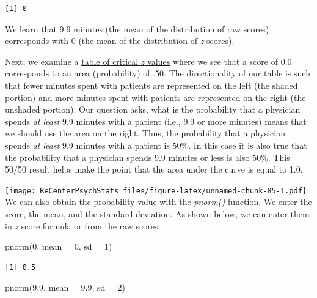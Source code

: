 \documentclass[
  11pt,
]{book}
\newenvironment{Shaded}{\begin{snugshade}}{\end{snugshade}}
\newcommand{\AttributeTok}[1]{\textcolor[rgb]{0.77,0.63,0.00}{#1}}
\newcommand{\DecValTok}[1]{\textcolor[rgb]{0.00,0.00,0.81}{#1}}
\newcommand{\FloatTok}[1]{\textcolor[rgb]{0.00,0.00,0.81}{#1}}
\newcommand{\FunctionTok}[1]{\textcolor[rgb]{0.00,0.00,0.00}{#1}}
\newcommand{\NormalTok}[1]{#1}
\begin{document}
\begin{verbatim}
[1] 0
\end{verbatim}

We learn that 9.9 minutes (the mean of the distribution of raw scores) corresponds with 0 (the mean of the distribution of \emph{z}-scores).

Next, we examine a \href{https://www.statology.org/z-table/}{table of critical \emph{z} values} where we see that a score of 0.0 corresponds to an area (probability) of .50. The directionality of our table is such that fewer minutes spent with patients are represented on the left (the shaded portion) and more minutes spent with patients are represented on the right (the unshaded portion). Our question asks, what is the probability that a physician spends \emph{at least} 9.9 minutes with a patient (i.e., 9.9 or more minutes) means that we should use the area on the right. Thus, the probability that a physician spends \emph{at least} 9.9 minutes with a patient is 50\%. In this case it is also true that the probability that a physician spends 9.9 minutes or less is also 50\%. This 50/50 result helps make the point that the area under the curve is equal to 1.0.

\texttt{[image: ReCenterPsychStats\_files/figure-latex/unnamed-chunk-85-1.pdf]}
We can also obtain the probability value with the \emph{pnorm()} function. We enter the score, the mean, and the standard deviation. As shown below, we can enter them in \emph{z} score formula or from the raw scores.

\begin{Shaded}
\begin{Highlighting}[]
\FunctionTok{pnorm}\NormalTok{(}\DecValTok{0}\NormalTok{, }\AttributeTok{mean =} \DecValTok{0}\NormalTok{, }\AttributeTok{sd =} \DecValTok{1}\NormalTok{)}
\end{Highlighting}
\end{Shaded}

\begin{verbatim}
[1] 0.5
\end{verbatim}

\begin{Shaded}
\begin{Highlighting}[]
\FunctionTok{pnorm}\NormalTok{(}\FloatTok{9.9}\NormalTok{, }\AttributeTok{mean =} \FloatTok{9.9}\NormalTok{, }\AttributeTok{sd =} \DecValTok{2}\NormalTok{)}
\end{Highlighting}
\end{Shaded}
\end{document}
